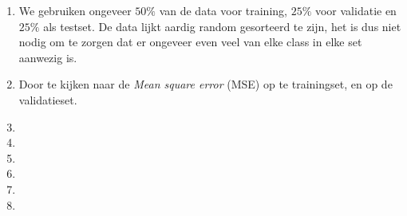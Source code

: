 \documentclass[a4paper,10pt,fleqn]{article}
\begin{document}
\begin{enumerate}[1.]
\begin{center}
	\end{center}

	\item We gebruiken ongeveer $50\%$ van de data voor training, $25\%$ voor validatie en $25\%$ als testset. De data lijkt aardig random gesorteerd te zijn, het is dus niet nodig om te zorgen dat er ongeveer even veel van elke class in elke set aanwezig is.

	\item Door te kijken naar de \textit{Mean square error} (MSE) op te trainingset, en op de validatieset.

	\item

	\item

	\item

	\item

	\item

	\item


\end{enumerate}
\end{document}
